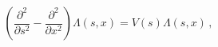 \begin{equation*}
\left( \frac{\partial ^{2}}{\partial s^{2}}-\frac{\partial ^{2}}{\partial
x^{2}}\right) \Lambda \left( s,x\right) =V\left( s\right) \Lambda \left(
s,x\right) \,,
\end{equation*}

